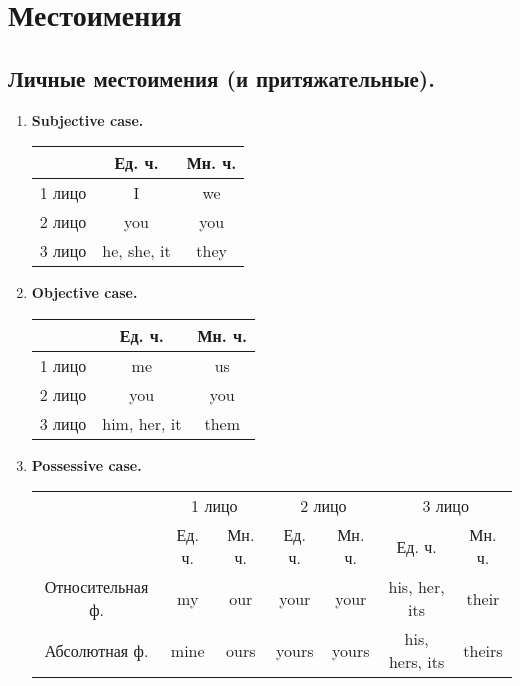 \documentclass[oneside]{book}
\begin{document}
	\chapter{Местоимения}
	\section{Личные местоимения (и притяжательные).}
	\begin{enumerate}
		\item \textbf{Subjective case.}
		\begin{center}
			\begin{tabular}{|c|c|c|}
				\hline

				& Ед. ч. & Мн. ч.
				\\
				\hline

				1 лицо & I & we
				\\
				\hline

				2 лицо & you & you
				\\
				\hline

				3 лицо & he, she, it & they
				\\
				\hline
			\end{tabular}
		\end{center}

		\item \textbf{Objective case.}
		\begin{center}
			\begin{tabular}{|c|c|c|}
				\hline

				& Ед. ч. & Мн. ч.
				\\
				\hline

				1 лицо & me & us
				\\
				\hline

				2 лицо & you & you
				\\
				\hline

				3 лицо & him, her, it & them
				\\
				\hline
			\end{tabular}
		\end{center}

		\item \textbf{Possessive case.}
		\begin{center}
			\begin{tabular}{|c|cc|cc|cc|}
				\hline
				\multirow{2}{*}{}& \multicolumn{2}{c|}{1 лицо}         & \multicolumn{2}{c|}{2 лицо}          & \multicolumn{2}{c|}{3 лицо}                  \\ \cline{2-7} 
								 & \multicolumn{1}{c|}{Ед. ч.}& Мн. ч. & \multicolumn{1}{c|}{Ед. ч.} & Мн. ч. & \multicolumn{1}{c|}{Ед. ч.}         & Мн. ч. \\ \hline
				Относительная ф. & \multicolumn{1}{c|}{my}    & our    & \multicolumn{1}{c|}{your}   & your   & \multicolumn{1}{c|}{his, her, its}  & their  \\ \hline
				Абсолютная ф.    & \multicolumn{1}{c|}{mine}  & ours   & \multicolumn{1}{c|}{yours}  & yours  & \multicolumn{1}{c|}{his, hers, its} & theirs \\ \hline
			\end{tabular}
		\end{center}
	\end{enumerate}
\end{document}
